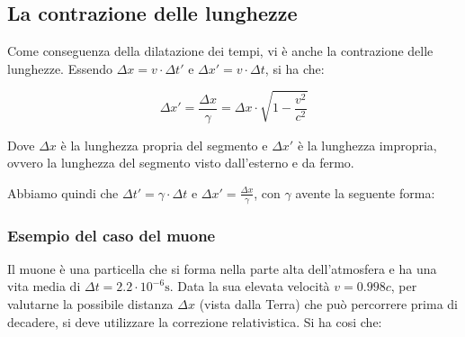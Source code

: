 \subsection{La contrazione delle lunghezze}

Come conseguenza della dilatazione dei tempi, vi è anche la contrazione delle lunghezze.
Essendo $\Delta x = v \cdot \Delta t'$ e $\Delta x' = v \cdot \Delta t$, si ha che:

\begin{equation*}
    \Delta x' = \frac{\Delta x}{\gamma} = \Delta x \cdot \sqrt{1-\frac{v^2}{c^2}}
\end{equation*}

Dove $\Delta x$ è la lunghezza propria del segmento e $\Delta x'$ è la lunghezza impropria, ovvero la lunghezza del segmento visto dall'esterno e da fermo.

Abbiamo quindi che $\Delta t' = \gamma \cdot \Delta t$ e $\Delta x' = \frac{\Delta x}{\gamma}$, con $\gamma$ avente la seguente forma:

\begin{figure}[H]
    \centering
\end{figure}

\subsubsection{Esempio del caso del muone}

Il muone è una particella che si forma nella parte alta dell'atmosfera e ha una vita media di $\Delta t = 2.2 \cdot 10^{-6} \si{\second}$.
Data la sua elevata velocità $v = 0.998c$, per valutarne la possibile distanza $\Delta x$ (vista dalla Terra) che può percorrere prima di decadere, si deve utilizzare la correzione relativistica.
Si ha cosi che:

